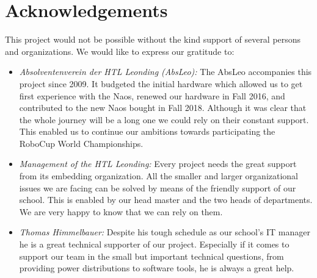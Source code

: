 \documentclass[11pt]{article}
\begin{document}
\section{Acknowledgements}
This project would not be possible without the kind support of several persons and organizations. We would like to express our gratitude to:

\begin{itemize}
	\item \emph{Absolventenverein der HTL Leonding (AbsLeo):} The AbsLeo accompanies this project since 2009. It budgeted the initial hardware which allowed us to get first experience with the Naos, renewed our hardware in Fall 2016, and contributed to the new Naos bought in Fall 2018. Although it was clear that the whole journey will be a long one we could rely on their constant support. This enabled us to continue our ambitions towards participating the RoboCup World Championships.
	
	\item \emph{Management of the HTL Leonding:} Every project needs the great support from its embedding organization. All the smaller and larger organizational issues we are facing can be solved by means of the friendly support of our school. This is enabled by our head master and the two heads of departments. We are very happy to know that we can rely on them.
	
	\item \emph{Thomas Himmelbauer:} Despite his tough schedule as our school's IT manager he is a great technical supporter of our project. Especially if it comes to support our team in the small but important technical questions, from providing power distributions to software tools, he is always a great help.
\end{itemize}
\end{document}

